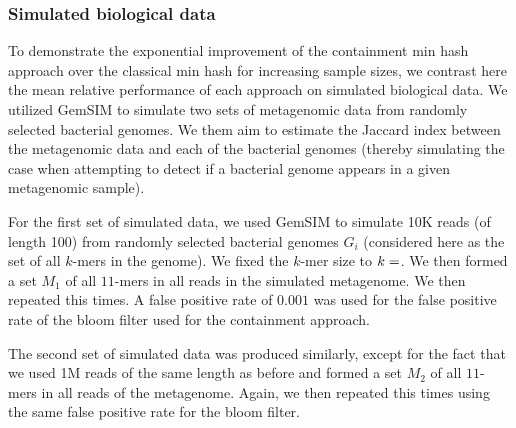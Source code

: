 \documentclass[11pt,reqno]{amsart}
\theoremstyle{remark}
\numberwithin{equation}{section}
\newcommand{\SimulatedBiologicalDataNumReplicates}{\protect }
\newcommand{\SimulatedBiologicalDataSmallKsize}{\protect }
\newcommand{\SimulatedBiologicalDataSmallNumGenomes}{\protect }
\newcommand{\SimulatedBiologicalDataSmallNumReplicates}{\protect }
\newcommand{\SimulatedBiologicalDataSmallRelSize}{\protect }
\begin{document}
\subsubsection{Simulated biological data}
To demonstrate the exponential improvement of the containment min hash approach over the classical min hash for increasing sample sizes, we contrast here the mean relative performance of each approach on simulated biological data. We utilized GemSIM \cite{mcelroy2012gemsim} to simulate two sets of metagenomic data from randomly selected bacterial genomes. We them aim to estimate the Jaccard index between the metagenomic data and each of the bacterial genomes (thereby simulating the case when attempting to detect if a bacterial genome appears in a given metagenomic sample).

For the first set of simulated data, we used GemSIM to simulate 10K reads (of length 100) from \SimulatedBiologicalDataSmallNumGenomes randomly selected bacterial genomes $G_i$ (considered here as the set of all $k$-mers in the genome). We fixed the $k$-mer size to $k=\SimulatedBiologicalDataSmallKsize$. We then formed a set $M_1$ of all $11$-mers in all reads in the simulated metagenome. We then repeated this \SimulatedBiologicalDataSmallNumReplicates times. A false positive rate of $0.001$ was used for the false positive rate of the bloom filter used for the containment approach.

The second set of simulated data was produced similarly, except for the fact that we used 1M reads of the same length as before and formed a set $M_2$ of all $11$-mers in all reads of the metagenome. Again, we then repeated this \SimulatedBiologicalDataNumReplicates times using the same false positive rate for the bloom filter.

 
 
\end{document}
